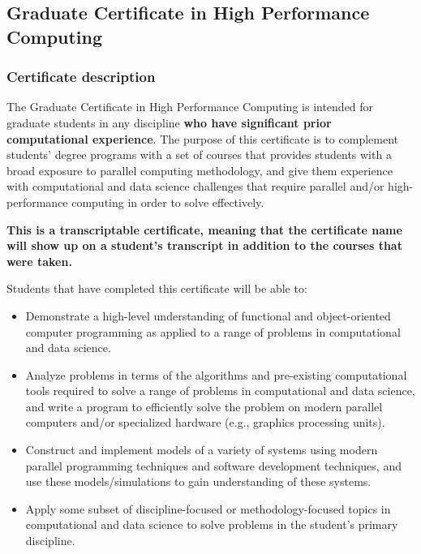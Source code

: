\subsection{Graduate Certificate in High Performance Computing}
\label{sec:cert_hpc}

\subsubsection{Certificate description}

The Graduate Certificate in High Performance Computing is intended for
graduate students in any discipline \textbf{who have significant prior
computational experience}.  The purpose of this certificate is to
complement students' degree programs with a set of courses that
provides students with a broad exposure to parallel computing
methodology, and give them experience with computational and data
science challenges that require parallel and/or high-performance
computing in order to solve effectively.    

\textbf{This is a transcriptable
certificate, meaning that the certificate name will show up on a
student's transcript in addition to the courses that were taken.}

\vspace{2mm}

\noindent
Students that have completed this certificate will be able to:

\begin{itemize}
\item  Demonstrate a high-level understanding of functional and
  object-oriented computer programming as applied to a range of
  problems in computational and data science.

\item  Analyze problems in terms of the algorithms and pre-existing
  computational tools required to solve a range of problems in
  computational and data science, and write a program to efficiently
  solve the problem on modern parallel computers and/or specialized
  hardware (e.g., graphics processing units).

\item  Construct and implement models of a variety of systems using
  modern parallel programming techniques and software development
  techniques, and use these models/simulations to gain understanding
  of these systems.

\item  Apply some subset of discipline-focused or methodology-focused
topics in computational and data science to solve problems in the
student's primary discipline.

\end{itemize}

